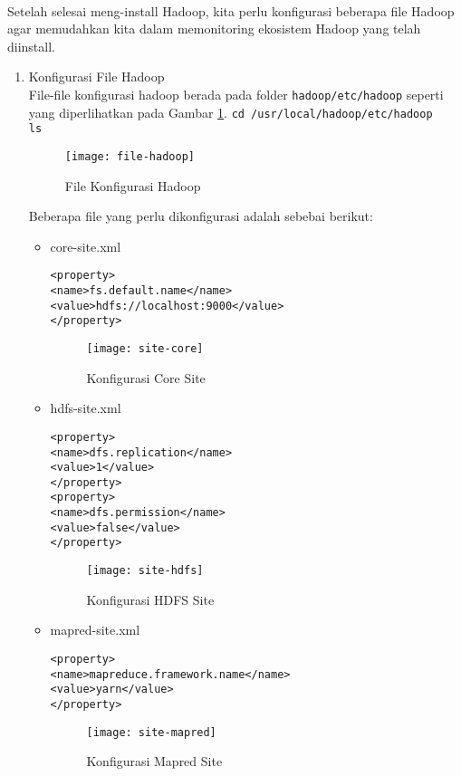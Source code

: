 \documentclass[a4paper]{tufte-handout}
\begin{document}
 \\
Setelah selesai meng-install Hadoop, kita perlu konfigurasi beberapa file Hadoop agar memudahkan kita dalam memonitoring ekosistem Hadoop yang telah diinstall.
\begin{enumerate}
\item Konfigurasi File Hadoop \\
File-file konfigurasi hadoop berada pada folder {\tt hadoop/etc/hadoop} seperti yang diperlihatkan pada Gambar \ref{gam:file-hadoop}.
{\tt cd /usr/local/hadoop/etc/hadoop} \\
{\tt ls}
\begin{figure}[!ht]
\texttt{[image: file-hadoop]}
\caption{File Konfigurasi Hadoop}
\label{gam:file-hadoop}
\end{figure}

Beberapa file yang perlu dikonfigurasi adalah sebebai berikut:
\begin{itemize}
\item core-site.xml
\begin{lstlisting}
<property>
<name>fs.default.name</name>
<value>hdfs://localhost:9000</value>
</property>
\end{lstlisting}
\begin{figure}[!ht]
\centering
\texttt{[image: site-core]}
\caption{Konfigurasi Core Site}
\label{gam:site-yarn}
\end{figure}

\item hdfs-site.xml
\begin{lstlisting}
<property>
<name>dfs.replication</name>
<value>1</value>
</property>
<property>
<name>dfs.permission</name>
<value>false</value>
</property>
\end{lstlisting}
\begin{figure}[!ht]
\centering
\texttt{[image: site-hdfs]}
\caption{Konfigurasi HDFS Site}
\label{gam:site-yarn}
\end{figure}

\item mapred-site.xml
\begin{lstlisting}
<property>
<name>mapreduce.framework.name</name>
<value>yarn</value>
</property>
\end{lstlisting}
\begin{figure}[!ht]
\texttt{[image: site-mapred]}
\caption{Konfigurasi Mapred Site}
\label{gam:site-yarn}
\end{figure}


\end{itemize}
\end{enumerate}
\end{document}
